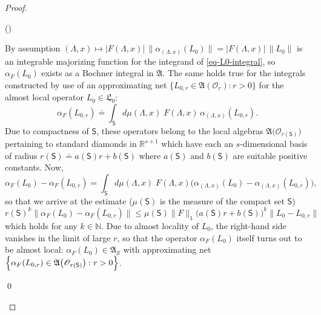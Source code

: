 \documentclass[11pt,twoside,openright]{report}
\theoremstyle{definition}
\theoremstyle{plain}
\theoremstyle{remark}
\theoremstyle{assumption}
\newcommand{\bset}[1]{\bigl\{ #1 \bigr\}}
\newcommand{\Bset}[1]{\Bigl\{ #1 \Bigr\}}
\newcommand{\abs}[1]{\lvert #1 \rvert}
\newcommand{\norm}[1]{\lVert #1 \rVert}
\newcommand{\bnorm}[1]{\bigl\lVert #1 \bigr\rVert}
\newcommand{\Nbb}{\mathbb{N}}
\newcommand{\Afrak}{\mathfrak{A}}
\newcommand{\Lfrak}{\mathfrak{L}}
\newcommand{\Oscr}{\mathscr{O}}
\newcommand{\Ssf}{\mathsf{S}}
\newcommand{\Rsone}{\mathbb{R}^{s + 1}}
\newcommand{\AS}{\mathfrak{A}_{\mathscr{S}}}
\newcommand{\aLax}{\alpha_{( \Lambda , x )}}
\newcommand{\AOr}{\mathfrak{A} ( \mathscr{O}_r )}
\newcounter{proofitem}
\newenvironment{prooflist}{\begin{list}{(\roman{proofitem})}%
  {\usecounter{proofitem} \setlength{\topsep}{0ex}%
   \setlength{\parsep}{0.2ex} \setlength{\itemsep}{0.4ex}%
   \setlength{\leftmargin}{0em} \setlength{\itemindent}{0.5em}%
   \setlength{\listparindent}{1em}}}{\qed \end{list}}
\begin{document}
\begin{proof}
  \begin{prooflist}
  \item By assumption $( \Lambda , x ) \mapsto \abs{F ( \Lambda , x
    )} \, \norm{\aLax ( L_0 )} = \abs{F ( \Lambda , x )} \,
    \norm{L_0}$ \cite[Corollary~I.5.4]{takesaki:1979} is an integrable
    majorizing function for the integrand of \eqref{eq-L0-integral},
    so $\alpha_F ( L_0 )$ exists as a Bochner integral in $\Afrak$. 
    The same holds true for the integrals constructed by use of an
    approximating net $\bset{L_{0 , r} \in \AOr : r > 0}$ for the
    almost local operator $L_0 \in \Lfrak_0$:
    \begin{equation*}
      \alpha_F ( L_{0,r} ) \doteq \int_\Ssf d \mu ( \Lambda , x ) \; F
      ( \Lambda , x ) \, \aLax ( L_{0,r} ) \text{.}
    \end{equation*}
    Due to compactness of $\Ssf$, these operators belong to the local
    algebras $\Afrak \bigl( \Oscr_{r ( \Ssf )} \bigr)$ pertaining to
    standard diamonds in $\Rsone$ which have each an $s$-dimensional
    basis of radius $r ( \Ssf ) \doteq a ( \Ssf ) r + b ( \Ssf )$
    where $a ( \Ssf )$ and $b ( \Ssf )$ are suitable positive
    constants. Now,
    \begin{equation*}
      \alpha_F ( L_0 ) - \alpha_F ( L_{0,r} ) = \int_\Ssf d \mu (
      \Lambda , x ) \; F ( \Lambda , x ) \bigl( \aLax ( L_0 ) - \aLax
      ( L_{0,r} ) \bigr) \text{,}
    \end{equation*}
    so that we arrive at the estimate ($\mu ( \Ssf )$ is the measure
    of the compact set $\Ssf$)
    \begin{equation*}
      r ( \Ssf )^k \bnorm{\alpha_F ( L_0 ) - \alpha_F ( L_{0,r} )}
      \leqslant \mu ( \Ssf ) \norm{F}_1 \bigl( a ( \Ssf ) r + b ( \Ssf
      ) \bigr)^k \norm{L_0 - L_{0,r}}
    \end{equation*}
    which holds for any $k \in \Nbb$. Due to almost locality of $L_0$,
    the right-hand side vanishes in the limit of large $r$, so that
    the operator $\alpha_F ( L_0 )$ itself turns out to be almost
    local: $\alpha_F ( L_0 ) \in \AS$ with approximating net
    $\Bset{\alpha_F ( L_{0,r} ) \in \Afrak \bigl( \Oscr_{r ( \Ssf )}
    \bigr) : r > 0}$.


\end{prooflist}
\end{proof}
\end{document}
